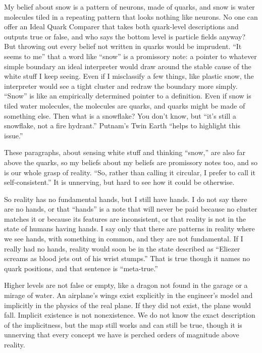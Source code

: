 My belief about snow is a pattern of neurons, made of quarks, and snow is water molecules tiled in a repeating pattern that looks nothing like neurons. No one can offer an Ideal Quark Comparer that takes both quark-level descriptions and outputs true or false, and who says the bottom level is particle fields anyway? But throwing out every belief not written in quarks would be imprudent. ``It seems to me'' that a word like ``snow'' is a promissory note: a pointer to whatever simple boundary an ideal interpreter would draw around the stable cause of the white stuff I keep seeing. Even if I misclassify a few things, like plastic snow, the interpreter would see a tight cluster and redraw the boundary more simply. ``Snow'' is like an empirically determined pointer to a definition. Even if snow is tiled water molecules, the molecules are quarks, and quarks might be made of something else. Then what is a snowflake? You don't know, but ``it's still a snowflake, not a fire hydrant.'' Putnam's Twin Earth ``helps to highlight this issue.'' 

These paragraphs, about sensing white stuff and thinking ``snow,'' are also far above the quarks, so my beliefs about my beliefs are promissory notes too, and so is our whole grasp of reality. ``So, rather than calling it circular, I prefer to call it self-consistent.''  It is unnerving, but hard to see how it could be otherwise.

So reality has no fundamental hands, but I still have hands. I do not say there are no hands, or that ``hands'' is a note that will never be paid because no cluster matches it or because its features are inconsistent, or that reality is not in the state of humans having hands. I say only that there are patterns in reality where we see hands, with something in common, and they are not fundamental. If I really had no hands, reality would soon be in the state described as ``Eliezer screams as blood jets out of his wrist stumps.'' That is true though it names no quark positions, and that sentence is ``meta-true.''

Higher levels are not false or empty, like a dragon not found in the garage or a mirage of water. An airplane's wings exist explicitly in the engineer's model and implicitly in the physics of the real plane. If they did not exist, the plane would fall. Implicit existence is not nonexistence. We do not know the exact description of the implicitness, but the map still works and can still be true, though it is unnerving that every concept we have is perched orders of magnitude above reality. 
